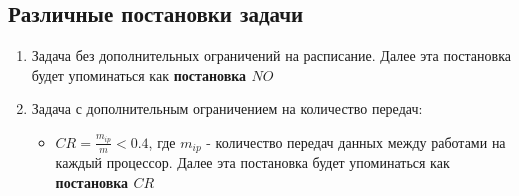 \subsection{Различные постановки задачи} \label{sec:crit}
\begin{enumerate}
    \item Задача без дополнительных ограничений на расписание. Далее эта постановка будет упоминаться как \textbf{постановка $NO$}
    \item Задача с дополнительным ограничением на количество передач:
          \begin{itemize}
              \item $CR = \frac{m_{ip}}{m} < 0.4$, где $m_{ip}$ - количество передач данных между работами на каждый процессор. Далее эта постановка будет упоминаться как \textbf{постановка $CR$}
          \end{itemize}
\end{enumerate}